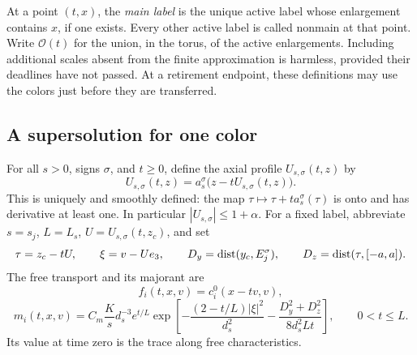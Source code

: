 At a point \((t,x)\), the \emph{main label} is the unique active
label whose enlargement contains \(x\), if one exists.  Every other
active label is called nonmain at that point.  Write \(\mathcal O(t)\)
for the union, in the torus, of the active enlargements.  Including
additional scales absent from the finite approximation is harmless,
provided their deadlines have not passed.  At a retirement endpoint,
these definitions may use the colors just before they are transferred.

\subsection{A supersolution for one color}

For all \(s>0\), signs \(\sigma\), and \(t\ge0\), define the
axial profile \(U_{s,\sigma}(t,z)\) by
\begin{equation}
 U_{s,\sigma}(t,z)
       =a_s^\sigma\bigl(z-tU_{s,\sigma}(t,z)\bigr).
 \label{cold:profile}
\end{equation}
This is uniquely and smoothly defined: the map
\(\tau\mapsto\tau+t a_s^\sigma(\tau)\) is onto and has derivative
at least one.  In particular \(|U_{s,\sigma}|\le1+\alpha\).
For a fixed label, abbreviate \(s=s_j\), \(L=L_s\),
\(U=U_{s,\sigma}(t,z_c)\), and set
\[
 \tau=z_c-tU,\qquad \xi=v-Ue_3,\qquad
 D_y=\operatorname{dist}(y_c,E_j^\sigma),\qquad
 D_z=\operatorname{dist}(\tau,[-a,a]).
\]
The free transport and its majorant are
\begin{equation}
 f_i(t,x,v)=c_i^0(x-tv,v),
 \label{cold:free-core}
\end{equation}
\begin{equation}
 m_i(t,x,v)=C_m\frac K{s}d_s^{-3}e^{t/L}
 \exp\left[-\frac{(2-t/L)|\xi|^2}{d_s^2}
           -\frac{D_y^2+D_z^2}{8d_s^2Lt}\right],\qquad 0<t\le L.
 \label{cold:barrier-definition}
\end{equation}
Its value at time zero is the trace along free characteristics.

